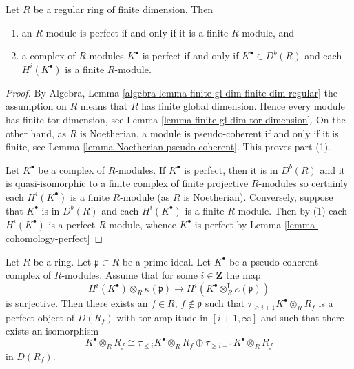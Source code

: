 \begin{lemma}
\label{lemma-regular-perfect}
Let $R$ be a regular ring of finite dimension. Then
\begin{enumerate}
\item an $R$-module is perfect if and only if it is a finite $R$-module, and
\item a complex of $R$-modules $K^\bullet$ is perfect if and only
if $K^\bullet \in D^b(R)$ and each $H^i(K^\bullet)$ is a finite $R$-module.
\end{enumerate}
\end{lemma}

\begin{proof}
By
Algebra, Lemma \ref{algebra-lemma-finite-gl-dim-finite-dim-regular}
the assumption on $R$ means that $R$ has finite global dimension.
Hence every module has finite tor dimension, see
Lemma \ref{lemma-finite-gl-dim-tor-dimension}.
On the other hand, as $R$ is Noetherian, a module is pseudo-coherent
if and only if it is finite, see
Lemma \ref{lemma-Noetherian-pseudo-coherent}.
This proves part (1).

\medskip\noindent
Let $K^\bullet$ be a complex of $R$-modules.
If $K^\bullet$ is perfect, then it is in $D^b(R)$ and it is
quasi-isomorphic to a finite complex of finite projective $R$-modules
so certainly each $H^i(K^\bullet)$ is a finite $R$-module (as $R$ is
Noetherian). Conversely, suppose that $K^\bullet$ is in $D^b(R)$
and each $H^i(K^\bullet)$ is a finite $R$-module. Then by (1) each
$H^i(K^\bullet)$ is a perfect $R$-module, whence $K^\bullet$ is
perfect by
Lemma \ref{lemma-cohomology-perfect}
\end{proof}

\begin{lemma}
\label{lemma-better-cut-complex-in-two}
Let $R$ be a ring. Let $\mathfrak p \subset R$ be a prime ideal.
Let $K^\bullet$ be a pseudo-coherent complex of $R$-modules.
Assume that for some $i \in \mathbf{Z}$ the map
$$
H^i(K^\bullet) \otimes_R \kappa(\mathfrak p)
\longrightarrow
H^i(K^\bullet \otimes_R^{\mathbf{L}} \kappa(\mathfrak p))
$$
is surjective. Then there exists an $f \in R$, $f \not \in \mathfrak p$
such that $\tau_{\geq i + 1}K^\bullet \otimes_R R_f$ is a perfect
object of $D(R_f)$ with tor amplitude in $[i + 1, \infty]$
and such that there exists an isomorphism
$$
K^\bullet \otimes_R R_f \cong
\tau_{\leq i}K^\bullet \otimes_R R_f \oplus
\tau_{\geq i + 1}K^\bullet \otimes_R R_f
$$
in $D(R_f)$.
\end{lemma}

